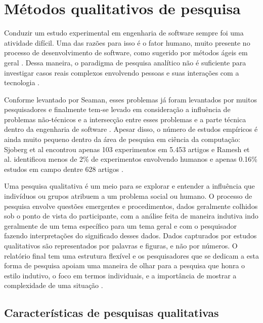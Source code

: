 \chapter{Métodos qualitativos de pesquisa} 
\label{cap:qualitativo}

Conduzir um estudo experimental em engenharia de software sempre foi uma
atividade difícil. Uma das razões para isso é o fator humano, muito presente 
no processo de desenvolvimento de software, como sugerido por métodos ágeis  em
geral \cite{AgileManifesto}. Dessa maneira, o paradigma de pesquisa analítico 
não é suficiente para investigar casos reais complexos envolvendo pessoas e 
suas interações com a tecnologia \cite{guidelines-case-study}.

Conforme levantado por Seaman, esses problemas já foram levantados por muitos
pesquisadores e finalmente tem-se levado em consideração a influência de
problemas não-técnicos e a intersecção entre esses problemas e a parte técnica
dentro da engenharia de software \cite{seaman}. 
Apesar disso, o número de estudos empíricos é ainda muito pequeno dentro da área
de pesquisa em ciência da computação: Sjoberg et al encontrou apenas 103
experimentos em 5.453 artigos \cite{sjoberg} e Ramesh et al. identificou menos
de 2\% de experimentos envolvendo humanos e apenas 0.16\% estudos em campo 
dentre 628 artigos \cite{ramesh} .

Uma pesquisa qualitativa é um meio para se explorar e entender a influência que 
indivíduos ou grupos atribuem a um problema social ou humano. O processo de
pesquisa envolve questões emergentes e procedimentos, dados geralmente colhidos
sob o ponto de vista do participante, com a análise feita de maneira indutiva
indo geralmente de um tema específico para um tema geral e com o pesquisador
fazendo interpretações do significado desses dados. Dados capturados por estudos
qualitativos são representados por palavras e figuras, e não por números.
O relatório final tem uma estrutura flexível e os pesquisadores que se
dedicam a esta forma de pesquisa apoiam uma maneira de olhar para a pesquisa que
honra o estilo indutivo, o foco em termos individuais, e a importância de mostrar a 
complexidade de uma situação \cite{creswell}. 

\section{Características de pesquisas qualitativas}

